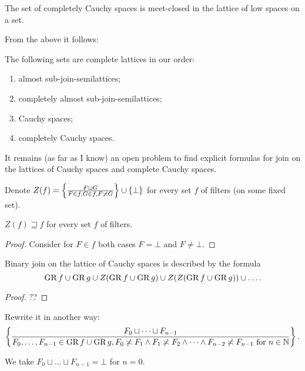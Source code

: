 \begin{cor}
The set of completely Cauchy spaces is meet-closed in the lattice of low spaces on a set.
\end{cor}

From the above it follows:

\begin{obvious}
The following sets are complete lattices in our order:
\begin{enumerate}
\item almost sub-join-semilattices;
\item completely almost sub-join-semilattices;
\item Cauchy spaces;
\item completely Cauchy spaces.
\end{enumerate}
\end{obvious}

It remains (as far as I know) an open problem to find explicit formulas for join on the lattices of Cauchy spaces and complete Cauchy spaces.

Denote $Z(f)=\left\{ \frac{F\sqcup G}{F\in f,G\in f,F\not\asymp G}\right\}\cup\{\bot\}$ for every set $f$ of filters (on some fixed set).

\begin{prop}
$Z(f)\sqsupseteq f$ for every set $f$ of filters.
\end{prop}

\begin{proof}
Consider for $F\in f$ both cases $F=\bot$ and $F\ne\bot$.
\end{proof}

\begin{prop}
Binary join on the lattice of Cauchy spaces is described by the formula
\[
\operatorname{GR} f\cup\operatorname{GR} g\cup Z(\operatorname{GR} f\cup\operatorname{GR} g)\cup Z(Z(\operatorname{GR} f\cup\operatorname{GR} g))\cup\dots.
\]
\end{prop}

\begin{proof}
??
\end{proof}

Rewrite it in another way:
\[
\left\{ \frac{F_0\sqcup\dots\sqcup F_{n-1}}{F_0,\dots,F_{n-1}\in\operatorname{GR} f\cup\operatorname{GR} g,F_0\not\asymp F_1\land F_1\not\asymp F_2\land\dots\land F_{n-2}\not\asymp F_{n-1} \text{ for } n\in\mathbb{N}}\right\}.
\]

\begin{rem}
We take $F_0\sqcup\dots\sqcup F_{n-1} = \bot$ for $n=0$.
\end{rem}

